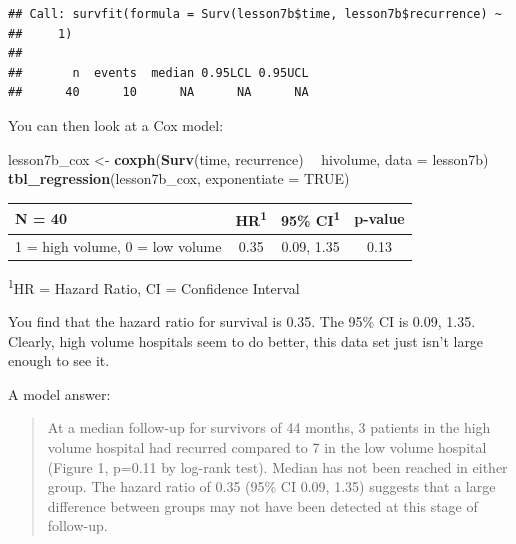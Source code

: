 \documentclass[]{book}
\newenvironment{Shaded}{\begin{snugshade}}{\end{snugshade}}
\newcommand{\DataTypeTok}[1]{\textcolor[rgb]{0.13,0.29,0.53}{#1}}
\newcommand{\DecValTok}[1]{\textcolor[rgb]{0.00,0.00,0.81}{#1}}
\newcommand{\KeywordTok}[1]{\textcolor[rgb]{0.13,0.29,0.53}{\textbf{#1}}}
\newcommand{\NormalTok}[1]{#1}
\newcommand{\OperatorTok}[1]{\textcolor[rgb]{0.81,0.36,0.00}{\textbf{#1}}}
\newcommand{\OtherTok}[1]{\textcolor[rgb]{0.56,0.35,0.01}{#1}}
\newcommand{\StringTok}[1]{\textcolor[rgb]{0.31,0.60,0.02}{#1}}
\begin{document}
\begin{Shaded}
\end{Shaded}

\begin{verbatim}
## Call: survfit(formula = Surv(lesson7b$time, lesson7b$recurrence) ~ 
##     1)
## 
##       n  events  median 0.95LCL 0.95UCL 
##      40      10      NA      NA      NA
\end{verbatim}

You can then look at a Cox model:

\begin{Shaded}
\begin{Highlighting}[]
\NormalTok{lesson7b_cox <-}
\StringTok{  }\KeywordTok{coxph}\NormalTok{(}\KeywordTok{Surv}\NormalTok{(time, recurrence) }\OperatorTok{~}\StringTok{ }\NormalTok{hivolume, }\DataTypeTok{data =}\NormalTok{ lesson7b)}
\KeywordTok{tbl_regression}\NormalTok{(lesson7b_cox, }\DataTypeTok{exponentiate =} \OtherTok{TRUE}\NormalTok{)}
\end{Highlighting}
\end{Shaded}

\captionsetup[table]{labelformat=empty,skip=1pt}
\begin{longtable}{lccc}
\toprule
\textbf{N = 40} & \textbf{HR}\textsuperscript{1} & \textbf{95\% CI}\textsuperscript{1} & \textbf{p-value} \\ 
\midrule
1 = high volume, 0 = low volume & 0.35 & 0.09, 1.35 & 0.13 \\ 
\bottomrule
\end{longtable}
\vspace{-5mm}
\begin{minipage}{\linewidth}
\textsuperscript{1}HR = Hazard Ratio, CI = Confidence Interval \\ 
\end{minipage}

You find that the hazard ratio for survival is 0.35. The 95\% CI is
0.09, 1.35. Clearly, high volume hospitals seem to do better, this data
set just isn't large enough to see it.

A model answer:

\begin{quote}
At a median follow-up for survivors of 44 months, 3 patients in the high
volume hospital had recurred compared to 7 in the low volume hospital
(Figure 1, p=0.11 by log-rank test). Median has not been reached in
either group. The hazard ratio of 0.35 (95\% CI 0.09, 1.35) suggests
that a large difference between groups may not have been detected at
this stage of follow-up.
\end{quote}
\end{document}
